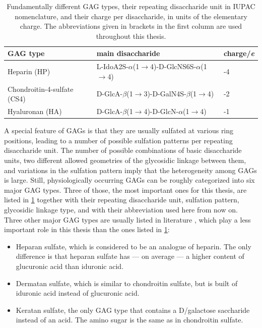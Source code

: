 

\begin{table}
\scriptsize
\centering
\renewcommand{\arraystretch}{1.3}
\begin{tabular}{lll}
\midrule
GAG type & main disaccharide & charge/\si{\elementarycharge} \\
\midrule
Heparin (HP) & L-IdoA2S-$\alpha$(1$\rightarrow$4)-D-GlcNS6S-$\alpha$(1$\rightarrow$4) & -4 \\
Chondroitin-4-sulfate (CS4) & D-GlcA-$\beta$(1$\rightarrow$3)-D-GalN4S-$\beta$(1$\rightarrow$4) & -2 \\
Hyaluronan (HA) & D-GlcA-$\beta$(1$\rightarrow$4)-D-GlcN-$\alpha$(1$\rightarrow$4) & -1 \\
\midrule
\end{tabular}
\caption{
Fundamentally different GAG types, their repeating disaccharide unit in IUPAC
nomenclature, and their charge per disaccharide, in units of the elementary
charge. The abbreviations given in brackets in the first column are used
throughout this thesis.}
\label{tab:bg:gagtypes}
\end{table}


A special feature of GAGs is that they are usually sulfated at various ring
positions, leading to a number of possible sulfation patterns per repeating
disaccharide unit. The number of possible combinations of basic disaccharide
units, two different allowed geometries of the glycosidic linkage between them,
and variations in the sulfation pattern imply that the heterogeneity among GAGs
is large. Still, physiologically occurring GAGs can be roughly categorized into
six major GAG types. Three of those, the most important ones for this thesis,
are listed in \cref{tab:bg:gagtypes} together with their repeating disaccharide
unit, sulfation pattern, glycosidic linkage type, and with their abbreviation
used here from now on. Three other major GAG types are usually listed in
literature \cite{gandhi_structure_2008}, which play a less important role in
this thesis than the ones listed in \cref{tab:bg:gagtypes}:

\begin{itemize}
\item Heparan sulfate, which is considered to be an analogue of heparin. The
only difference is that heparan sulfate has --- on average --- a higher content
of glucuronic acid than iduronic acid.
\item Dermatan sulfate, which is similar to chondroitin sulfate, but is built of
iduronic acid instead of glucuronic acid.
\item Keratan sulfate, the only GAG type that contains a D\-/galactose
saccharide instead of an acid. The amino sugar is the same as in chondroitin
sulfate.
\end{itemize}

